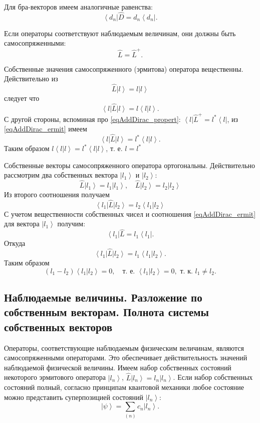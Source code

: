 Для бра-векторов имеем аналогичные равенства:
\begin{equation}
\left<d_n\right| \hat{D}  = d_n \left<d_n\right|.
\end{equation}

Если операторы соответствуют наблюдаемым величинам, они должны быть самосопряженными:
\begin{equation}
\hat{L}  = \hat{L}^{+}.
\label{eqAddDirac_ermit}
\end{equation}

Собственные значения самосопряженного (эрмитова) оператора
вещественны. Действительно из 
\[
\hat{L} \left| l \right> = l \left| l \right>
\]
следует что 
\[
\left< l \right| \hat{L} \left| l \right> = l \left< l \right|
\left. l \right>.
\]
С другой стороны, вспоминая про \eqref{eqAddDirac_propert}:
$\left< l \right| \hat{L}^{+} = l^{*} \left< l \right|$, из
\eqref{eqAddDirac_ermit} имеем
\[
\left< l \right| \hat{L} \left| l \right> = l^{*} \left< l \right|
\left. l \right>.
\] 
Таким образом $l\left< l \right|
\left. l \right> = l^{*}\left< l \right|
\left. l \right>$, т. е. $l  = l^{*}$

Собственные векторы самосопряженного оператора ортогональны. 
Действительно рассмотрим два собственных вектора 
$\left| l_1 \right>$ и $\left| l_2 \right>$:
\[
\hat{L} \left| l_1 \right> = l_1 \left| l_1 \right>, \quad
\hat{L} \left| l_2 \right> = l_2 \left| l_2 \right>
\]
Из второго соотношения получаем
\[
\left< l_1 \right| \hat{L} \left| l_2 \right> = l_2 \left< l_1 \right| \left. l_2 \right>
\]
С учетом вещественности собственных чисел и соотношения
\eqref{eqAddDirac_ermit} для вектора $\left| l_1 \right>$ получим:
\[
\left< l_1 \right| \hat{L} = l_1 \left< l_1 \right|.
\]
Откуда
\[
\left< l_1 \right| \hat{L} \left| l_2 \right> = l_1 \left< l_1 \right| \left. l_2 \right>.
\] 
Таким образом
\[
\left(l_1 - l_2\right) \left< l_1 \right| \left. l_2 \right> = 0, 
\quad \mbox{т. е. } \left< l_1 \right| \left. l_2 \right> = 0,
\mbox{ т. к. } l_1 \neq l_2.
\] 

\subsection{Наблюдаемые  величины.  Разложение  по  собственным  векторам.  
Полнота  системы  собственных  векторов}
Операторы, соответствующие наблюдаемым физическим величинам, являются
самосопряженными операторами. Это обеспечивает действительность
значений наблюдаемой физической величины. Имеем набор собственных
состояний некоторого эрмитового  оператора  
$\left| l_n \right>$,  $\hat{L} \left| l_n \right> = l_n \left| l_n
\right>$.  Если набор собственных состояний полный, согласно принципам
квантовой механики любое состояние можно представить суперпозицией
состояний $\left| l_n \right>$:
\begin{equation}  
\left| \psi \right> = \sum_{(n)} c_n \left| l_n \right>.
\end{equation}  

